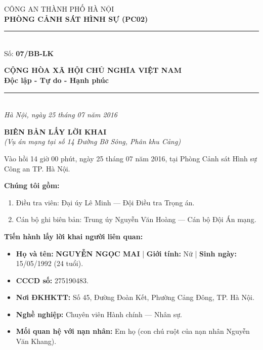 \documentclass[12pt,a4paper]{article}
\begin{document}
\noindent
\begin{minipage}[t]{0.46\textwidth}
    \begin{center}
        \fontsize{11pt}{13pt}\selectfont
        CÔNG AN THÀNH PHỐ HÀ NỘI\\
        \textbf{PHÒNG CẢNH SÁT HÌNH SỰ (PC02)}\\[-0.2em]
        \rule{3.2cm}{0.6pt}\\[0.25cm]
        \fontsize{11pt}{13pt}\selectfont Số: \textbf{07/BB-LK}
    \end{center}
\end{minipage}
\hfill
\begin{minipage}[t]{0.52\textwidth}
    \begin{center}
        \fontsize{11pt}{13pt}\selectfont
        \textbf{CỘNG HÒA XÃ HỘI CHỦ NGHĨA VIỆT NAM}\\
        \textbf{Độc lập - Tự do - Hạnh phúc}\\[-0.2em]
        \rule{3.6cm}{0.6pt}\\[0.25cm]
        \textit{Hà Nội, ngày 25 tháng 07 năm 2016}
    \end{center}
\end{minipage}

\vspace{0.5cm}

\begin{center}
    \textbf{\Large BIÊN BẢN LẤY LỜI KHAI}\\[0.15cm]
    \textit{(Vụ án mạng tại số 14 Đường Bờ Sông, Phân khu Cảng)}
\end{center}

\vspace{0.3cm}


Vào hồi 14 giờ 00 phút, ngày 25 tháng 07 năm 2016, tại Phòng Cảnh sát Hình sự Công an TP. Hà Nội.

\textbf{Chúng tôi gồm:}

\begin{enumerate}[label=\arabic*., leftmargin=*, itemsep=2pt, topsep=2pt, parsep=0pt]
  \item Điều tra viên: Đại úy Lê Minh — Đội Điều tra Trọng án.
  \item Cán bộ ghi biên bản: Trung úy Nguyễn Văn Hoàng — Cán bộ Đội Án mạng.

\end{enumerate}
\textbf{Tiến hành lấy lời khai người liên quan:}

\begin{itemize}[leftmargin=*, itemsep=2pt, topsep=2pt, parsep=0pt]
  \item \textbf{Họ và tên:} \textbf{NGUYỄN NGỌC MAI} | \textbf{Giới tính:} Nữ | \textbf{Sinh ngày:} 15/05/1992 (24 tuổi).
  \item \textbf{CCCD số:} 275190483.
  \item \textbf{Nơi ĐKHKTT:} Số 45, Đường Đoàn Kết, Phường Cảng Đông, TP. Hà Nội.
  \item \textbf{Nghề nghiệp:} Chuyên viên Hành chính — Nhân sự.
  \item \textbf{Mối quan hệ với nạn nhân:} Em họ (con chú ruột của nạn nhân Nguyễn Văn Khang).


\end{itemize}
\end{document}
